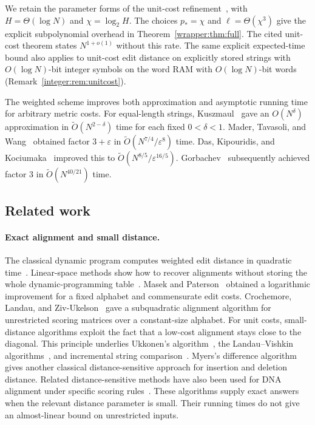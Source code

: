\documentclass[11pt]{article}
\theoremstyle{definition}
\newcommand{\1}{\mathbf 1}
\begin{document}
We retain the parameter forms of the unit-cost refinement~\cite{openai},
with $H=\Theta(\log N)$ and $\chi=\log_2H$.
The choices $p_*=\chi$ and $\ell=\Theta(\chi^3)$ give the explicit
subpolynomial overhead in Theorem~\ref{wrapper:thm:full}.
The cited unit-cost theorem states $N^{1+o(1)}$ without this rate.
The same explicit expected-time bound also applies to unit-cost edit
distance on explicitly stored strings with $O(\log N)$-bit integer
symbols on the word RAM with $O(\log N)$-bit words
(Remark~\ref{integer:rem:unitcost}).

The weighted scheme improves both approximation and asymptotic running
time for arbitrary metric costs.
For equal-length strings, Kuszmaul~\cite{kuszmaul2019} gave an
$O(N^\delta)$ approximation in $\widetilde O(N^{2-\delta})$ time
for each fixed $0<\delta<1$.
Mader, Tavasoli, and Wang~\cite{mtw} obtained factor $3+\varepsilon$ in
$\widetilde O(N^{7/4}/\varepsilon^8)$ time.
Das, Kipouridis, and Kociumaka~\cite{dkk} improved this to
$\widetilde O(N^{8/5}/\varepsilon^{16/5})$.
Gorbachev~\cite{gor2026} subsequently achieved factor $3$ in
$\widetilde O(N^{40/21})$ time.

\subsection{Related work}

\paragraph{Exact alignment and small distance.}
The classical dynamic program computes weighted edit distance in
quadratic time~\cite{NW70,WF74,sellers1974}.
Linear-space methods show how to recover alignments without storing the
whole dynamic-programming table~\cite{Hir75,MM88}.
Masek and Paterson~\cite{MP80} obtained a logarithmic improvement for
a fixed alphabet and commensurate edit costs.
Crochemore, Landau, and Ziv-Ukelson~\cite{clz2003} gave a
subquadratic alignment algorithm for unrestricted scoring matrices
over a constant-size alphabet.
For unit costs, small-distance algorithms exploit the fact that a
low-cost alignment stays close to the diagonal.
This principle underlies Ukkonen's algorithm~\cite{Ukk85}, the
Landau--Vishkin algorithms~\cite{LV88,LV89}, and incremental string
comparison~\cite{LMS98}.
Myers's difference algorithm~\cite{Mye86} gives another classical
distance-sensitive approach for insertion and deletion distance.
Related distance-sensitive methods have also been used for DNA
alignment under specific scoring rules~\cite{ZSSM00}.
These algorithms supply exact answers when the relevant distance
parameter is small. Their running times do not give an almost-linear
bound on unrestricted inputs.
\end{document}
